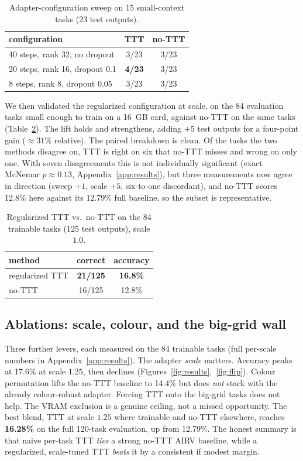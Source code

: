 \documentclass[11pt]{article}
\begin{document}
\begin{table}[H]
\centering
\caption{Adapter-configuration sweep on 15 small-context tasks (23 test outputs).}
\label{tab:sweep}
\begin{tabular}{lcc}
\toprule
configuration & TTT & no-TTT \\
\midrule
40 steps, rank 32, no dropout      & 3/23 & 3/23 \\
20 steps, rank 16, dropout 0.1     & \textbf{4/23} & 3/23 \\
8 steps, rank 8, dropout 0.05      & 3/23 & 3/23 \\
\bottomrule
\end{tabular}
\end{table}

We then validated the regularized configuration at scale, on the 84 evaluation tasks small enough to
train on a 16~GB card, against no-TTT on the same tasks (Table~\ref{tab:scale}). The lift holds and
strengthens, adding $+5$ test outputs for a four-point gain ($\approx 31\%$ relative). The paired breakdown is
clean. Of the tasks the two methods disagree on, TTT is right on six that no-TTT misses and wrong on
only one. With seven disagreements this is not individually significant (exact McNemar
$p\approx0.13$, Appendix~\ref{app:results}), but three measurements now agree in direction (sweep
$+1$, scale $+5$, six-to-one discordant), and no-TTT scores 12.8\% here against its 12.79\% full
baseline, so the subset is representative.

\begin{table}[H]
\centering
\caption{Regularized TTT vs.\ no-TTT on the 84 trainable tasks (125 test outputs), scale $1.0$.}
\label{tab:scale}
\begin{tabular}{lcc}
\toprule
method & correct & accuracy \\
\midrule
regularized TTT & \textbf{21/125} & \textbf{16.8\%} \\
no-TTT          & 16/125 & 12.8\% \\
\bottomrule
\end{tabular}
\end{table}

\subsection{Ablations: scale, colour, and the big-grid wall}
Three further levers, each measured on the 84 trainable tasks (full per-scale numbers in
Appendix~\ref{app:results}). The adapter \emph{scale} matters. Accuracy peaks at 17.6\% at scale
$1.25$, then declines (Figures~\ref{fig:results},~\ref{fig:flip}). Colour permutation lifts the
no-TTT baseline to 14.4\% but does \emph{not} stack with the already colour-robust adapter. Forcing
TTT onto the big-grid tasks does not help. The VRAM exclusion is a genuine ceiling, not a missed
opportunity. The best blend, TTT at scale $1.25$ where trainable and no-TTT elsewhere, reaches
\textbf{16.28\%} on the full 120-task evaluation, up from 12.79\%. The honest summary is that naive per-task
TTT \emph{ties} a strong no-TTT AIRV baseline, while a regularized, scale-tuned TTT \emph{beats} it by
a consistent if modest margin.
\end{document}
